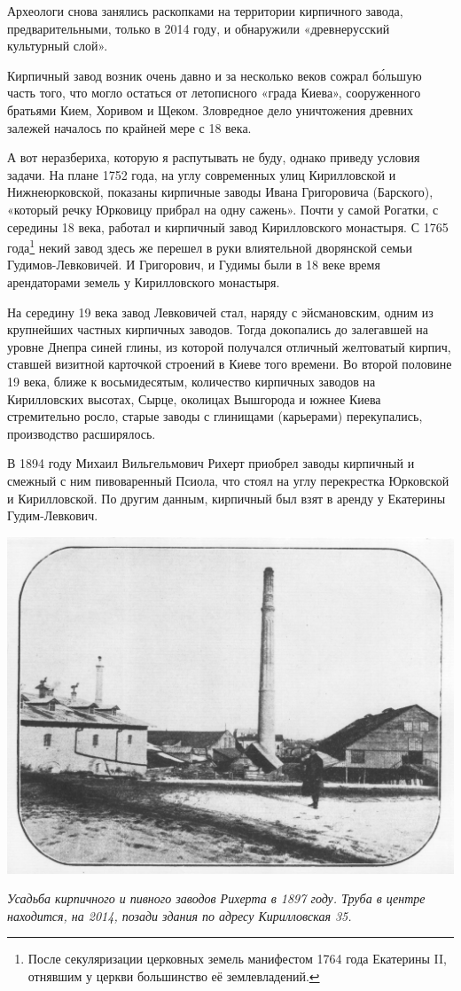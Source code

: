 Археологи снова занялись раскопками на территории кирпичного завода, предварительными, только в 2014 году, и обнаружили «древнерусский культурный слой».

Кирпичный завод возник очень давно и за несколько веков сожрал б\'ольшую часть того, что могло остаться от летописного «града Киева», сооруженного братьями Кием, Хоривом и Щеком. Зловредное дело уничтожения древних залежей началось по крайней мере с 18 века.

А вот неразбериха, которую я распутывать не буду, однако приведу условия задачи. На плане 1752 года, на углу современных улиц Кирилловской и Нижнеюрковской, показаны кирпичные заводы Ивана Григоровича (Барского), «который речку Юрковицу прибрал на одну сажень». Почти у самой Рогатки, с середины 18 века, работал и кирпичный завод Кирилловского монастыря. С 1765 года\footnote{После секуляризации церковных земель манифестом 1764 года Екатерины II, отнявшим у церкви большинство её землевладений.} некий завод здесь же перешел в руки влиятельной дворянской семьи Гудимов-Левковичей. И Григорович, и Гудимы были в 18 веке время арендаторами земель у Кирилловского монастыря.

На середину 19 века завод Левковичей стал, наряду с эйсмановским, одним из крупнейших частных кирпичных заводов. Тогда докопались до залегавшей на уровне Днепра синей глины, из которой получался отличный желтоватый кирпич, ставшей визитной карточкой строений в Киеве того времени. Во второй половине 19 века, ближе к восьмидесятым, количество кирпичных заводов на Кирилловских высотах, Сырце, околицах Вышгорода и южнее Киева стремительно росло, старые заводы с глинищами (карьерами) перекупались, производство расширялось.

В 1894 году Михаил Вильгельмович Рихерт приобрел заводы кирпичный и смежный с ним пивоваренный Псиола, что стоял на углу перекрестка Юрковской и Кирилловской. По другим данным, кирпичный был взят в аренду у Екатерины Гудим-Левкович.

\begin{center}
\includegraphics[width=\linewidth]{chast-kirvys/lys02/1897-rihert-kirp.jpg}

\textit{Усадьба кирпичного и пивного заводов Рихерта в 1897 году. Труба в центре находится, на 2014, позади здания по адресу Кирилловская 35.}
\end{center}

